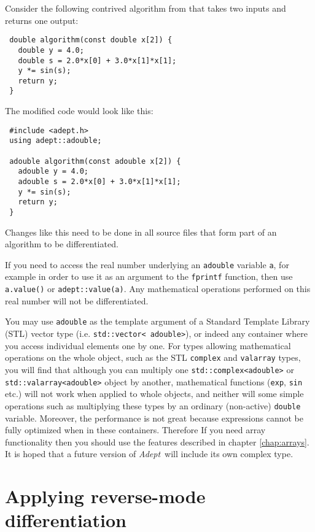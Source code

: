\documentclass[a4,oneside]{book}
\def\codesize{\small}
\def\Adept{\emph{Adept}}
\def\code#1{{\codesize\texttt{#1}}}
\begin{document}
Consider the following contrived algorithm from \cite{Hogan2014} that
takes two inputs and returns one output:

\begin{lstlisting}
 double algorithm(const double x[2]) {
   double y = 4.0;
   double s = 2.0*x[0] + 3.0*x[1]*x[1];
   y *= sin(s);
   return y;
 }
\end{lstlisting}

\noindent The modified code would look like this:

\begin{lstlisting}
 #include <adept.h>
 using adept::adouble;

 adouble algorithm(const adouble x[2]) {
   adouble y = 4.0;
   adouble s = 2.0*x[0] + 3.0*x[1]*x[1];
   y *= sin(s);
   return y;
 }
\end{lstlisting}

\noindent Changes like this need to be done in all source files that
form part of an algorithm to be differentiated. 

If you need to access the real number underlying an \code{adouble}
variable \code{a}, for example in order to use it as an argument to
the \code{fprintf} function, then use \code{a.value()} or
\code{adept::value(a)}. Any mathematical operations performed on
this real number will not be differentiated.

You may use \code{adouble} as the template argument of a Standard
Template Library (STL) vector type (i.e.  \code{std::vector\textless
  adouble\textgreater}), or indeed any container where you access
individual elements one by one. For types allowing mathematical
operations on the whole object, such as the STL \code{complex} and
\code{valarray} types, you will find that although you can multiply
one \code{std::complex\textless adouble\textgreater} or
\code{std::valarray\textless adouble\textgreater} object by another,
mathematical functions (\code{exp}, \code{sin} etc.) will not work
when applied to whole objects, and neither will some simple operations
such as multiplying these types by an ordinary (non-active)
\code{double} variable.  Moreover, the performance is not great
because expressions cannot be fully optimized when in these
containers.  Therefore If you need array functionality then you should
use the features described in chapter \ref{chap:arrays}.  It is hoped
that a future version of \Adept\ will include its own complex type.

\section{Applying reverse-mode differentiation}
\label{sec:adjoint}
\end{document}
